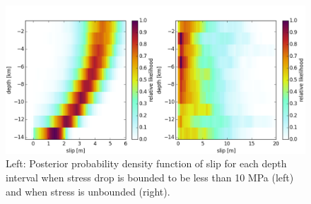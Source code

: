 \documentclass[12pt]{article}
\begin{document}
\begin{figure}
\includegraphics[width=1.0\textwidth]{figure_2}
\raggedleft
\caption{Left: Posterior probability density function of slip for each depth interval when stress drop is bounded to be less than 10 MPa (left) and when stress is unbounded (right).}  
\end{figure}

%


\end{document}
